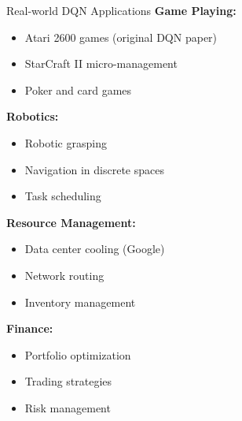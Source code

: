 \documentclass[aspectratio=169,10pt]{beamer}
\begin{document}
\begin{frame}{Real-world DQN Applications}
\textbf{Game Playing:}
\begin{itemize}
    \item Atari 2600 games (original DQN paper)
    \item StarCraft II micro-management
    \item Poker and card games
\end{itemize}

\textbf{Robotics:}
\begin{itemize}
    \item Robotic grasping
    \item Navigation in discrete spaces
    \item Task scheduling
\end{itemize}

\textbf{Resource Management:}
\begin{itemize}
    \item Data center cooling (Google)
    \item Network routing
    \item Inventory management
\end{itemize}

\textbf{Finance:}
\begin{itemize}
    \item Portfolio optimization
    \item Trading strategies
    \item Risk management
\end{itemize}
\end{frame}
\end{document}
